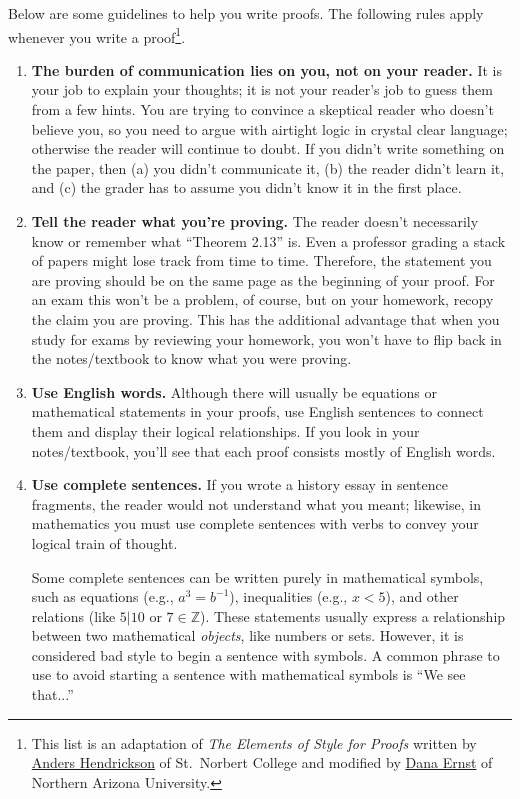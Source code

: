 Below are some guidelines to help you write proofs. 
The following rules apply whenever you write a proof\footnote{
	This list is an adaptation of \emph{The Elements of Style for Proofs} written by \href{http://home.snc.edu/andershendrickson/}{Anders Hendrickson} of St.~Norbert College
	and modified by \href{http://danaernst.com/}{Dana Ernst} of Northern Arizona University.
	}.

\begin{enumerate}

\item \textbf{The burden of communication lies on you, not on your reader.}
	It is your job to explain your thoughts;
	it is not your reader's job to guess them from a few hints.
	You are trying to convince a skeptical reader who doesn't believe you,
	so you need to argue with airtight logic in crystal clear language;
	otherwise the reader will continue to doubt.
	If you didn't write something on the paper, then
	  (a) you didn't communicate it,
	  (b) the reader didn't learn it, and
	  (c) the grader has to assume you didn't know it in the first place.
	  
\item \textbf{Tell the reader what you're proving.}
	The reader doesn't necessarily know or remember what ``Theorem 2.13'' is.
	Even a professor grading a stack of papers might lose track from time to time.
	Therefore, the statement you are proving should be on the same page as the beginning of your proof.
	For an exam this won't be a problem, of course,
	but on your homework, recopy the claim you are proving.
	This has the additional advantage that when you study for exams by reviewing your homework,
	you won't have to flip back in the notes/textbook to know what you were proving.

\item \textbf{Use English words.}
	Although there will usually be equations or mathematical statements in your proofs,
	use English sentences to connect them and display their logical relationships.
	If you look in your notes/textbook, you'll see that each proof consists mostly of English words.

\item \textbf{Use complete sentences.}
	If you wrote a history essay in sentence fragments,
	the reader would not understand what you meant;
	likewise, in mathematics you must use complete sentences with verbs
	to convey your logical train of thought.
	
	Some complete sentences can be written purely in mathematical symbols, 
	such as 
	  equations (e.g., $a^3=b^{-1}$),
	  inequalities (e.g., $x<5$),
	  and other relations (like $5\big|10$ or $7\in\mathbb{Z}$).
	These statements usually express a relationship between two mathematical \emph{objects},
	like numbers or sets.  However, it is considered bad style to begin a sentence with symbols.  A common phrase to use to avoid starting a sentence with mathematical symbols is ``We see that...''


\end{enumerate}

